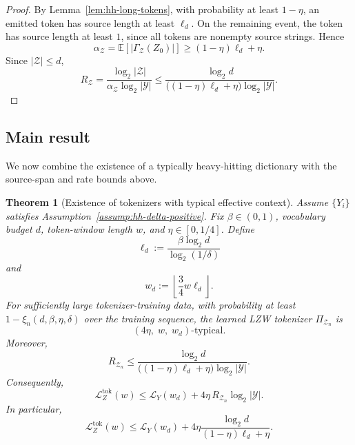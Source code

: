 \documentclass{article}
\theoremstyle{plain}
\newtheorem{theorem}{Theorem}[section]
\theoremstyle{definition}
\theoremstyle{remark}
\begin{document}
    \begin{proof}
    By Lemma~\ref{lem:hh-long-tokens}, with probability at least $1-\eta$, an
    emitted token has source length at least $\ell_d$. On the remaining event, the
    token has source length at least $1$, since all tokens are nonempty source
    strings. Hence
    \[
        \alpha_{\mathcal Z}
        =
        \mathbb E\!\left[
            |\Gamma_{\mathcal Z}(Z_0)|
        \right]
        \ge
        (1-\eta)\ell_d+\eta.
    \]
    Since $|\mathcal Z|\le d$,
    \[
        R_{\mathcal Z}
        =
        \frac{\log_2|\mathcal Z|}
             {\alpha_{\mathcal Z}\log_2|\mathcal Y|}
        \le
        \frac{\log_2 d}
             {\big((1-\eta)\ell_d+\eta\big)\log_2|\mathcal Y|}.
    \]
    \end{proof}
    
    \subsection{Main result}
    
    We now combine the existence of a typically heavy-hitting dictionary with the
    source-span and rate bounds above.
    
    \begin{theorem}[Existence of tokenizers with typical effective context]
    \label{thm:exists-typical-effective-context}
    Assume $\{Y_i\}$ satisfies Assumption~\ref{assump:hh-delta-positive}. Fix
    $\beta\in(0,1)$, vocabulary budget $d$, token-window length $w$, and
    $\eta\in[0,1/4]$. Define
    \[
        \ell_d
        :=
        \frac{\beta\log_2 d}{\log_2(1/\delta)}
    \]
    and
    \[
        w_d
        :=
        \left\lfloor \frac{3}{4}w\ell_d \right\rfloor .
    \]
    For sufficiently large tokenizer-training data, with probability at least
    $1-\xi_n(d,\beta,\eta,\delta)$ over the training sequence, the learned LZW
    tokenizer $\Pi_{\mathcal Z_n}$ is
    \[
        \left(4\eta,\; w,\; w_d\right)\text{-typical}.
    \]
    Moreover,
    \[
        R_{\mathcal Z_n}
        \le
        \frac{\log_2 d}
             {\big((1-\eta)\ell_d+\eta\big)\log_2|\mathcal Y|}.
    \]
    Consequently,
    \[
        \mathcal L_Z^{\mathrm{tok}}(w)
        \le
        \mathcal L_Y(w_d)
        +
        4\eta\,R_{\mathcal Z_n}\log_2|\mathcal Y|.
    \]
    In particular,
    \[
        \mathcal L_Z^{\mathrm{tok}}(w)
        \le
        \mathcal L_Y(w_d)
        +
        4\eta
        \frac{\log_2 d}
             {(1-\eta)\ell_d+\eta}.
    \]
    \end{theorem}
    
\end{document}
